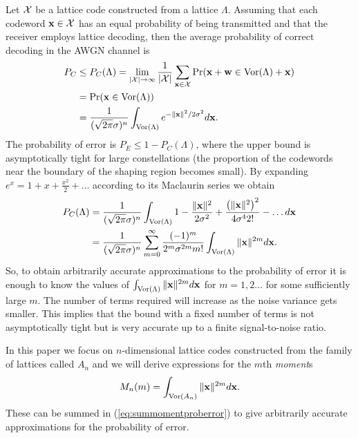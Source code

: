 \documentclass[draftcls, onecolumn, 11pt]{IEEEtran}
\begin{document}
Let $\mathcal X$ be a lattice code constructed from a lattice $\Lambda$.  Assuming that each codeword $\mathbf{x} \in \mathcal X$ has an equal probability of being transmitted and that the receiver employs lattice decoding, then the average probability of correct decoding in the AWGN channel is
\begin{align}
P_C &\leq P_C(\Lambda) = \lim_{\abs{\calX}\rightarrow \infty}
 \frac{1}{\abs{\calX}} \sum_{\xbf\in \calX} \prob( \xbf + \wbf \in
\vor(\Lambda) + \xbf )  \nonumber \\
&= \prob(\xbf \in \vor(\Lambda) ) \nonumber \\
&=   \frac{1}{(\sqrt{2\pi}\sigma)^n} \int_{\vor(\Lambda)}
e^{-\|\xbf\|^2 / 2\sigma^2 } d\xbf. \label{eq:PEgaussian}
\end{align}
The probability of error is $P_E \leq 1 - P_C(\Lambda)$, where the upper bound is asymptotically tight for large constellations (the proportion of the codewords near the boundary of the shaping region becomes small).  By expanding $e^x = 1  + x + \frac{x^2}{2} + \dots$ according to its Maclaurin series we obtain
\begin{align}
P_C(\Lambda)  &= \frac{1}{(\sqrt{2\pi}\sigma)^n}\int_{\vor(\Lambda)} 1
- \frac{\|\xbf\|^2}{2\sigma^2} + \frac{\left(\|\xbf\|^2\right)^2}{
4\sigma^42!} - \dots d\xbf \nonumber \\
&= \frac{1}{(\sqrt{2\pi}\sigma)^n} \sum_{m=0}^\infty
\frac{(-1)^m}{2^m\sigma^{2m}m!} \int_{\vor(\Lambda)} \|\xbf\|^{2m}
d\xbf.  \label{eq:summomentproberror}
\end{align}
So, to obtain arbitrarily accurate approximations to the probability of error it is enough to know the values of $\int_{\operatorname{Vor}(\Lambda)} \|\mathbf{x}\|^{2m} d\mathbf{x}$ for $m=1,2\dots$ for some sufficiently large $m$.  The number of terms required will increase as the noise variance gets smaller.  This implies that the bound with a fixed number of terms is not asymptotically tight but is very accurate up to a finite signal-to-noise ratio.

\newcommand{\calM}{M}
In this paper we focus on $n$-dimensional lattice codes constructed from the family of lattices called $A_n$ and  we will derive expressions for the $m$th \emph{moment}s
\[
 \calM_n(m) = \int_{\vor(A_n)} \|\xbf\|^{2m} d\xbf.
\]
These can be summed in (\ref{eq:summomentproberror}) to give arbitrarily accurate approximations for the probability of error.
\end{document}
